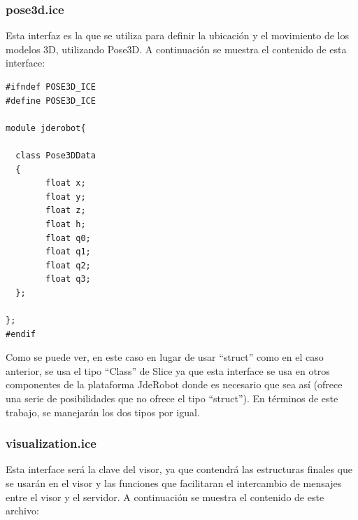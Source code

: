 \subsubsection{pose3d.ice}
Esta interfaz es la que se utiliza para definir la ubicación y el movimiento de los modelos 3D, utilizando Pose3D. A continuación se muestra el contenido de esta interface:


\begin{lstlisting}[frame=single]
#ifndef POSE3D_ICE
#define POSE3D_ICE

module jderobot{

  class Pose3DData
  {
		float x;
		float y;
		float z;
  		float h;
		float q0;
		float q1;
		float q2;
		float q3;
  };

}; 
#endif
\end{lstlisting}
Como se puede ver, en este caso en lugar de usar ``struct'' como en el caso anterior, se usa el tipo ``Class'' de Slice  ya que esta interface se usa en otros componentes de la plataforma JdeRobot donde es necesario que sea así (ofrece una serie de posibilidades que no ofrece el tipo ``struct''). En términos de este trabajo, se manejarán los dos tipos por igual.

\subsubsection{visualization.ice}
Esta interface será la clave del visor, ya que contendrá las estructuras finales que se usarán en el visor y las funciones que facilitaran el intercambio de mensajes entre el visor y el servidor. A continuación se muestra el contenido de este archivo:

